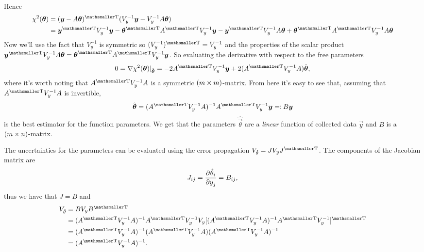 \documentclass[
	10pt,
	draft
]{scrreprt}
\newcommand{\transpose}[1]{\ensuremath{#1}^{\mathrm{ \mathsmaller T}}}
\newcommand{\pderiv}[3][]{\dfrac{{\de^{#1}}#2}{\de #3^{#1}}}%
\begin{document}
Hence
\begin{equation}
\begin{aligned}
\chi^2(\vec{\theta})
&= \transpose{(\vec{y} - A\vec{\theta})}(V_y^{-1}\vec{y} -V_y^{-1}A\vec{\theta}) \\
&= \transpose{\vec{y}}V_y^{-1}\vec{y} - \transpose{\vec{\theta}}\transpose{A}V_y^{-1}\vec{y}
-\transpose{\vec{y}}V_y^{-1}A\vec{\theta} + \transpose{\vec{\theta}}\transpose{A} V_y^{-1} A\vec{\theta}
\end{aligned}
\end{equation}
Now we'll use the fact that $V_y^{-1}$ is symmetric so $\transpose{(V_y^{-1})}=V_y^{-1}$ and the properties of the scalar product $\transpose{\vec{y}}V_y^{-1}A\vec{\theta} = \transpose{\vec{\theta}}\transpose{A}V_y^{-1}\vec{y}$.
So evaluating the derivative with respect to the free parameters
\begin{equation}
0 = \V \chi^2(\vec{\theta})\rvert_{\hat{\vec{\theta}}} = -2 \transpose{A}V_y^{-1} \vec{y} + 2 (\transpose{A}V_y^{-1}A)\hat{\vec{\theta}},
\end{equation}
where it's worth noting that $\transpose{A}V_y^{-1}A$ is a symmetric $(m\times m)$-matrix.
From here it's easy to see that, assuming that $\transpose{A}V_y^{-1}A$ is invertible,
\begin{equation}
\hat{\vec{\theta}} = (\transpose{A}V_y^{-1}A)^{-1} \transpose{A}V_y^{-1}\vec{y}
\eqqcolon B\vec{y}
\end{equation}
is the best estimator for the function parameters.
We get that the parameters $\hat{\vec{\theta}}$ are a \emph{linear} function of collected data $\vec{y}$ and $B$ is a $(m\times n)$-matrix.


The uncertainties for the parameters can be evaluated using the error propagation $V_{\hat{\theta}} = J V_y\transpose{J}$.
The components of the Jacobian matrix are
\begin{equation}
J_{ij} = \pderiv{\hat{\theta}_i}{y_j} = B_{ij},
\end{equation}
thus we have that $J=B$ and
\begin{equation}
\begin{aligned}
V_{\hat{\theta}}
&= B V_y\transpose{B}\\
&= (\transpose{A}V_y^{-1}A)^{-1} \transpose{A}V_y^{-1}V_y\transpose{[(\transpose{A}V_y^{-1}A)^{-1} \transpose{A}V_y^{-1}]}\\
&= (\transpose{A}V_y^{-1}A)^{-1} (\transpose{A}V_y^{-1}A) (\transpose{A}V_y^{-1}A)^{-1} \\
&= (\transpose{A}V_y^{-1}A)^{-1}.
\end{aligned}
\end{equation}
\end{document}
